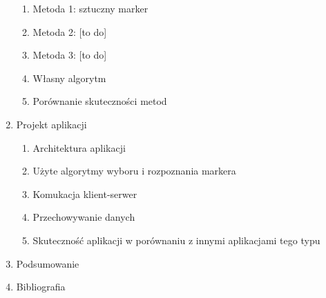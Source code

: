\begin{enumerate}
  \begin{enumerate}
   \item Metoda 1: sztuczny marker
   \item Metoda 2: [to do]
   \item Metoda 3: [to do]
   \item Własny algorytm
   \item Porównanie skuteczności metod
  \end{enumerate}
 \item Projekt aplikacji
  \begin{enumerate}
   \item Architektura aplikacji
   \item Użyte algorytmy wyboru i rozpoznania markera
   \item Komukacja klient-serwer
   \item Przechowywanie danych
   \item Skuteczność aplikacji w porównaniu z innymi aplikacjami tego typu
  \end{enumerate}
 \item Podsumowanie
 \item Bibliografia
\end{enumerate}
